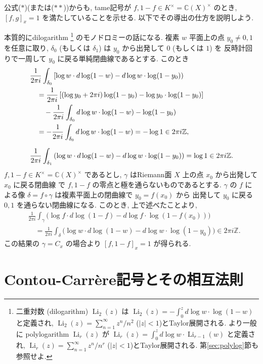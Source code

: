 \documentclass[12pt,twoside]{jarticle}
\newcommand\Z{{\mathbb Z}} %
\newcommand\C{{\mathbb C}} %
\theoremstyle{definition} %
\theoremstyle{definition} %
\theoremstyle{definition} %
\numberwithin{theorem}{section}
\numberwithin{equation}{section}
\numberwithin{figure}{section}
\numberwithin{table}{section}
\newcommand\secref[1]{第\ref{#1}節}
\newcommand\tame[3]{\left[#2,#3\right]_{#1}}
\newcommand\Li{\operatorname{Li}}
\begin{document}
公式($\ast$)(または($\ast\ast$))からも,
tame記号が $f,1-f\in K^\times=\C(X)^\times$ のとき,
$\tame{x}{f}{g}=1$ を満たしていることを示せる.
以下でその導出の仕方を説明しよう.

本質的にdilogarithm%
\footnote{
二重対数 (dilogarithm) $\Li_2(z)$ は $\Li_2(z)=-\int_0^z d\log w\cdot\log(1-w)$
と定義され, $\Li_2(z)=\sum_{n=1}^\infty z^n/n^2$ ($|z|<1$)とTaylor展開される.
より一般に polylogarithm $\Li_r(z)$
が $\Li_r(z)=\int_0^z d\log w\cdot\Li_{r-1}(w)$ と定義され,
$\Li_r(z)=\sum_{n=1}^\infty z^n/n^r$ ($|z|<1$)とTaylor展開される.
\secref{sec:polylog}も参照せよ.
}%
のモノドロミーの話になる.
複素 $w$ 平面上の点 $y_0\ne 0,1$ を任意に取り,
$\delta_0$ (もしくは $\delta_1$) は $y_0$ から出発して $0$ (もしくは $1$) を
反時計回りで一周して $y_0$ に戻る単純閉曲線であるとする.
このとき
\begin{align*}
&
\frac{1}{2\pi i}\int_{\delta_0}
\left[
 \log w\cdot d\log(1-w) - d\log w\cdot\log(1-y_0)
\right)
\\ & \quad
=\frac{1}{2\pi i}\left[
   (\log y_0+2\pi i)\log(1-y_0) - \log y_0\cdot\log(1-y_0)
\right]
\\ & \qquad
-\frac{1}{2\pi i}\int_{\delta_0} d\log w\cdot\log(1-w)
-\log(1-y_0)
\\ & \quad
= -\frac{1}{2\pi i}\int_{\delta_0} d\log w\cdot\log(1-w)
= -\log 1
\in 2\pi i\Z,
\\[\medskipamount]
&
\frac{1}{2\pi i}\int_{\delta_1}
\left(
 \log w \cdot d\log(1-w) - d\log w\cdot\log(1-y_0)
\right)
=\log 1\in 2\pi i\Z.
\end{align*}
$f,1-f\in K^\times=\C(X)^\times$ であるとし,
$\gamma$ はRiemann面 $X$ 上の点 $x_0$ から出発して $x_0$ に戻る閉曲線
で $f,1-f$ の零点と極を通らないものであるとする.
$\gamma$ の $f$ による像 $\delta=f\circ\gamma$ は複素平面上の閉曲線で $y_0=f(x_0)$ から
出発して $y_0$ に戻る $0,1$ を通らない閉曲線になる.
このとき, 上で述べたことより,
\begin{align*}
&
\frac{1}{2\pi i}\int_\gamma
\bigl( \log f\cdot d\log(1-f) - d\log f\cdot\log(1-f(x_0)) \bigr)
\\ & \quad
=
\frac{1}{2\pi i}\int_\delta
\bigl( \log w\cdot d\log(1-w) - d\log w\cdot\log(1-y_0) \bigr)
\in 2\pi i\Z.
\end{align*}
この結果の $\gamma=C_x$ の場合より $\tame{x}{f}{1-f}=1$ が得られる.


\section{Contou-Carr\`ere記号とその相互法則}
\end{document}
